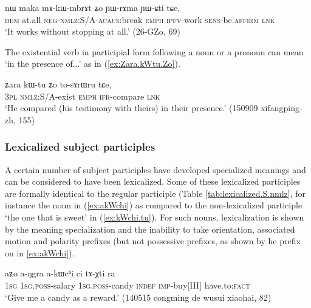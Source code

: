 \begin{exe}
\ex \label{ex:mAkWmbrAt.YWrAma}
 \gll nɯ maka mɤ-kɯ-mbrɤt ʑo ɲɯ-rɤma ɲɯ-ɕti tɕe,  \\
 \textsc{dem} at.all  \textsc{neg}-\textsc{nmlz}:S/A-\textsc{acaus}:break \textsc{emph} \textsc{ipfv}-work \textsc{sens}-be.\textsc{affirm} \textsc{lnk} \\
 \glt `It works without stopping at all.' (26-GZo, 69)
\end{exe}

The existential verb  in participial form  following a noun or a pronoun can mean `in the presence of...' as in (\ref{ex:Zara.kWtu.Zo}).

\begin{exe}
\ex \label{ex:Zara.kWtu.Zo}
\gll ʑara kɯ-tu ʑo to-sɤrɯru tɕe, \\
\textsc{3pl} \textsc{nmlz}:S/A-exist \textsc{emph} \textsc{ifr}-compare \textsc{lnk} \\
\glt `He compared (his testimony with theirs) in their presence.' (150909 xifangping-zh, 155)
\end{exe}

\subsubsection{Lexicalized subject participles} \label{ex:lexicalized.subject.participle}
A certain number of subject participles have developed specialized meanings and can be considered to have been lexicalized. Some of these lexicalized participles are formally identical to the regular participle (Table  \ref{tab:lexicalized.S.nmlz}, for instance the noun  in (\ref{ex:akWchi})  as compared to the non-lexicalized participle  `the one that is sweet' in (\ref{ex:kWchi.tu}). For such nouns, lexicalization is shown by the meaning specialization and the inability to take orientation, associated motion and polarity prefixes (but not possessive prefixes, as shown by he prefix  on  in \ref{ex:akWchi}).

\begin{exe}
\ex \label{ex:akWchi}
 \gll aʑo a-ŋgra a-kɯcʰi ci tɤ-χti ra \\
 \textsc{1sg} \textsc{1sg}.\textsc{poss}-salary \textsc{1sg}.\textsc{poss}-candy \textsc{indef} \textsc{imp}-buy[III] have.to:\textsc{fact} \\
\glt `Give me a candy as a reward.' (140515 congming de wusui xiaohai, 82)
\end{exe}

